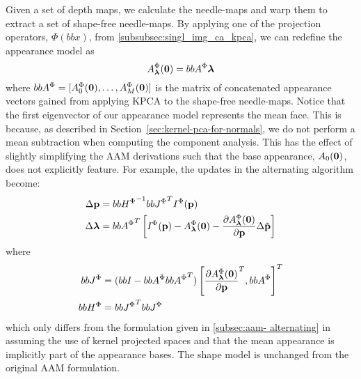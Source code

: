 Given a set of depth maps, we calculate the needle-maps and warp them to extract
a set of shape-free needle-maps. By applying one of the projection operators,
$\Phi(bb{x})$, from \cref{subsubsec:singl_img_ca_kpca}, we can
redefine the appearance model as
\begin{equation}\label{eq:aam-kernel-appearance-model}
    A_{\boldsymbol{\mathbf{\lambda}}}^{\Phi}(\boldsymbol{\mathbf{0}}) = bb{A}^{\Phi} \boldsymbol{\mathbf{\lambda}}
\end{equation}
where $bb{A}^{\Phi} = [A_0^{\Phi}(\boldsymbol{\mathbf{0}}), \ldots, A_M^{\Phi}(\boldsymbol{\mathbf{0}})]$
is the matrix of concatenated appearance vectors gained from applying KPCA to
the shape-free needle-maps. Notice that the first eigenvector of our appearance
model represents the mean face. This is because, as described in
Section~\ref{sec:kernel-pca-for-normals}, we do not perform a mean subtraction
when computing the component analysis. This has the effect of slightly
simplifying the AAM derivations such that the base appearance, $A_0(\boldsymbol{\mathbf{0}})$,
does not explicitly feature. For example, the updates in the alternating
algorithm become:
\begin{equation}
    \begin{aligned}\label{eq:aam-kernel-alternating-update}
        \Delta \boldsymbol{\mathbf{p}}       &= {bb{H}^{\Phi}}^{-1} {bb{J}^{\Phi}}^{T} I^{\Phi}(\boldsymbol{\mathbf{p}}) \\
        \Delta \boldsymbol{\mathbf{\lambda}} &= {bb{A}^{\Phi}}^T \left[ I^{\Phi}(\boldsymbol{\mathbf{p}}) - A^{\Phi}_{\boldsymbol{\mathbf{\lambda}}}(\boldsymbol{\mathbf{0}}) - \frac{\partial A^{\Phi}_{\boldsymbol{\mathbf{\lambda}}}(\boldsymbol{\mathbf{0}})}{\partial \boldsymbol{\mathbf{p}}} \Delta \tilde{\boldsymbol{\mathbf{p}}} \right]
    \end{aligned}
\end{equation}
where 
\begin{equation*}
    \begin{aligned}
        bb{J}^{\Phi} &= (bb{I} - bb{A}^{\Phi} {bb{A}^{\Phi}}^T) \left[ {\frac{\partial A^{\Phi}_{\boldsymbol{\mathbf{\lambda}}}(\boldsymbol{\mathbf{0}})}{\partial \boldsymbol{\mathbf{p}}}}^T, bb{A}^{\Phi} \right]^T \\
        bb{H}^{\Phi} &= {bb{J}^{\Phi}}^{T} bb{J}^{\Phi}
    \end{aligned}
\end{equation*}
which only differs from the formulation given in \cref{subsec:aam-
alternating} in assuming the use of kernel projected spaces and that the mean
appearance is implicitly part of the appearance bases. The shape model is
unchanged from the original AAM formulation.

